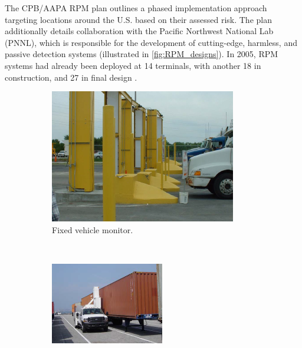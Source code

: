 \documentclass{report}
\begin{document}
The CPB/AAPA RPM plan outlines a phased implementation approach targeting locations around the U.S. based on their assessed risk. The plan additionally details collaboration with the Pacific Northwest National Lab (PNNL), which is responsible for the development of cutting-edge, harmless, and passive detection systems (illustrated in \autoref{fig:RPM_designs}). In 2005, RPM systems had already been deployed at 14 terminals, with another 18 in construction, and 27 in final design \cite{Simmons2005}.


\begin{figure}
        \centering
        \begin{subfigure}[b]{0.3\textwidth}
                \includegraphics[width=\textwidth,scale=1]{./figures/fixed_vehicle.png}
                \caption{Fixed  vehicle monitor.}
                \label{fig:fixed_vehicle}
        \end{subfigure}%
        ~ %
        \begin{subfigure}[b]{0.3\textwidth}
                \includegraphics[width=\textwidth,scale=1]{./figures/mobile_cargo.png}

\end{subfigure}
\end{figure}
\end{document}
